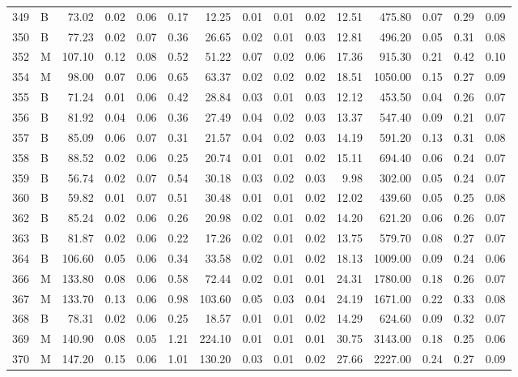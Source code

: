 \begin{table}[ht]
\begin{tabular}{rlrrrrrrrrrrrrr}
  349 & B & 73.02 & 0.02 & 0.06 & 0.17 & 12.25 & 0.01 & 0.01 & 0.02 & 12.51 & 475.80 & 0.07 & 0.29 & 0.09 \\ 
  350 & B & 77.23 & 0.02 & 0.07 & 0.36 & 26.65 & 0.02 & 0.01 & 0.03 & 12.81 & 496.20 & 0.05 & 0.31 & 0.08 \\ 
  352 & M & 107.10 & 0.12 & 0.08 & 0.52 & 51.22 & 0.07 & 0.02 & 0.06 & 17.36 & 915.30 & 0.21 & 0.42 & 0.10 \\ 
  354 & M & 98.00 & 0.07 & 0.06 & 0.65 & 63.37 & 0.02 & 0.02 & 0.02 & 18.51 & 1050.00 & 0.15 & 0.27 & 0.09 \\ 
  355 & B & 71.24 & 0.01 & 0.06 & 0.42 & 28.84 & 0.03 & 0.01 & 0.03 & 12.12 & 453.50 & 0.04 & 0.26 & 0.07 \\ 
  356 & B & 81.92 & 0.04 & 0.06 & 0.36 & 27.49 & 0.04 & 0.02 & 0.03 & 13.37 & 547.40 & 0.09 & 0.21 & 0.07 \\ 
  357 & B & 85.09 & 0.06 & 0.07 & 0.31 & 21.57 & 0.04 & 0.02 & 0.03 & 14.19 & 591.20 & 0.13 & 0.31 & 0.08 \\ 
  358 & B & 88.52 & 0.02 & 0.06 & 0.25 & 20.74 & 0.01 & 0.01 & 0.02 & 15.11 & 694.40 & 0.06 & 0.24 & 0.07 \\ 
  359 & B & 56.74 & 0.02 & 0.07 & 0.54 & 30.18 & 0.03 & 0.02 & 0.03 & 9.98 & 302.00 & 0.05 & 0.24 & 0.07 \\ 
  360 & B & 59.82 & 0.01 & 0.07 & 0.51 & 30.48 & 0.01 & 0.01 & 0.02 & 12.02 & 439.60 & 0.05 & 0.25 & 0.08 \\ 
  362 & B & 85.24 & 0.02 & 0.06 & 0.26 & 20.98 & 0.02 & 0.01 & 0.02 & 14.20 & 621.20 & 0.06 & 0.26 & 0.07 \\ 
  363 & B & 81.87 & 0.02 & 0.06 & 0.22 & 17.26 & 0.02 & 0.01 & 0.02 & 13.75 & 579.70 & 0.08 & 0.27 & 0.07 \\ 
  364 & B & 106.60 & 0.05 & 0.06 & 0.34 & 33.58 & 0.02 & 0.01 & 0.02 & 18.13 & 1009.00 & 0.09 & 0.24 & 0.06 \\ 
  366 & M & 133.80 & 0.08 & 0.06 & 0.58 & 72.44 & 0.02 & 0.01 & 0.01 & 24.31 & 1780.00 & 0.18 & 0.26 & 0.07 \\ 
  367 & M & 133.70 & 0.13 & 0.06 & 0.98 & 103.60 & 0.05 & 0.03 & 0.04 & 24.19 & 1671.00 & 0.22 & 0.33 & 0.08 \\ 
  368 & B & 78.31 & 0.02 & 0.06 & 0.25 & 18.57 & 0.01 & 0.01 & 0.02 & 14.29 & 624.60 & 0.09 & 0.32 & 0.07 \\ 
  369 & M & 140.90 & 0.08 & 0.05 & 1.21 & 224.10 & 0.01 & 0.01 & 0.01 & 30.75 & 3143.00 & 0.18 & 0.25 & 0.06 \\ 
  370 & M & 147.20 & 0.15 & 0.06 & 1.01 & 130.20 & 0.03 & 0.01 & 0.02 & 27.66 & 2227.00 & 0.24 & 0.27 & 0.09 \\ 

\end{tabular}
\end{table}
